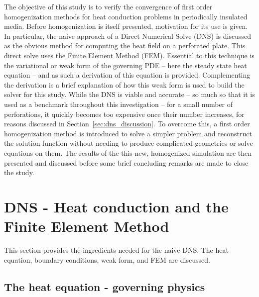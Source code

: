 \documentclass{article}
\makeatletter
\providecommand\FloatBarrier{\par\begingroup\let\@elt\relax
  \edef\@tempa{\@botlist\@deferlist\@dbldeferlist}%
  \ifx\@tempa\@empty\else\clearpage\fi\endgroup}
\makeatother
\begin{document}
The objective of this study is to verify the convergence of first order
homogenization methods for heat conduction problems in periodically insulated
media. Before homogenization is itself presented, motivation for its use is
given. In particular, the naive approach of a Direct Numerical Solve (DNS) is
discussed as the obvious method for computing the heat field on a perforated
plate. This direct solve uses the Finite Element Method (FEM). Essential to this technique is the variational or weak form of the governing PDE -- here the steady state heat equation -- and as such a derivation of this equation is provided. 
Complementing the derivation is a
brief explanation of how this weak form is used to build the solver for this study. While the DNS is viable and accurate -- so much so that it is used
as a benchmark throughout this investigation -- for a small number of
perforations, it quickly becomes too expensive once their number increases, for
reasons discussed in Section~\ref{sec:dns_discussion}. To overcome this, a first order homogenization method is
introduced to solve a simpler problem and reconstruct the solution function
without needing to produce complicated geometries or solve equations on them.
The results of the this new, homogenized simulation are then presented and discussed before some brief concluding remarks are made to close the study.

\FloatBarrier
\section{DNS - Heat conduction and the Finite Element Method}

This section provides the ingredients needed for the naive DNS. The heat
equation, boundary conditions, weak form, and FEM are discussed.

\FloatBarrier
\subsection{The heat equation - governing physics}
\end{document}
